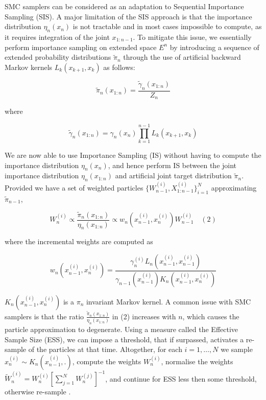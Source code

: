 \documentclass[12pt]{elsarticle}
\begin{document}
SMC samplers can be considered as an adaptation to Sequential Importance Sampling (SIS). A major limitation of the SIS approach is that the importance distribution $\eta_n(x_n)$ is not tractable and in most cases impossible to compute, as it requires integration of the joint $x_{1:n-1}$. To mitigate this issue,  we essentially perform importance sampling on extended space $E^n$ by introducing a sequence of extended probability distributions $\tilde{\pi}_n$ through the use of artificial backward Markov kernels $L_k(x_{k+1},x_k)$ as follows:

\[
\tilde{\pi}_n(x_{1:n}) = \frac{\tilde{\gamma}_n(x_{1:n})}{Z_n}
\]

where 

\[
\tilde{\gamma}_n(x_{1:n}) = \gamma_n(x_n) \prod_{k=1}^{n-1} L_k(x_{k+1},x_k)
\]

We are now able to use Importance Sampling (IS) without having to compute the importance distribution $\eta_n(x_n)$, and hence perform IS between the joint importance distribution $\eta_n(x_{1:n})$ and artificial joint target distribution $\tilde{\pi}_n$. Provided we have a set of weighted particles $\{W_{n-1}^{(i)}, X_{1:n-1}^{(i)}\}_{i=1}^N$ approximating $\tilde{\pi}_{n-1}$,

\[
W_n^{(i)} \propto \frac{\tilde{\pi}_n(x_{1:n})}{\eta_n(x_{1:n})} \propto w_n(x_{n-1}^{(i)}, x_n^{(i)})W_{n-1}^{(i)} \quad (2)
\]

where the incremental weights are computed as

\[
w_n(x_{n-1}^{(i)}, x_n^{(i)}) = \frac{\gamma_n^{(i)}L_{n}(x_{n-1}^{(i)}, x_{n-1}^{(i)})}{\gamma_{n-1}(x_{n-1}^{(i)}) K_n(x_{n-1}^{(i)}, x_n^{(i)})}
\]

$K_n(x_{n-1}^{(i)}, x_n^{(i)})$ is a $\pi_n$ invariant Markov kernel. A common issue with SMC samplers is that the ratio $\frac{\tilde{\pi}_n(x_{1:n})}{\eta_n(x_{1:n})}$ in (2) increases with $n$, which causes the particle approximation to degenerate. Using a measure called the Effective Sample Size (ESS), we can impose a threshold, that if surpassed, activates a re-sample of the particles at that time. Altogether, for each $i = 1, \dots, N$ we sample $x_n^{(i)} \sim K_n(x_{n-1}^{(i)}, .)$, compute the weights $W_n^{(i)}$, normalise the weights $\tilde{W}_n^{(i)} = W_n^{(i)}[\sum_{j=1}^N W_n^{(j)}]^{-1}$, and continue for ESS less then some threshold, otherwise re-sample \cite{DelMoral2005}.
\end{document}
